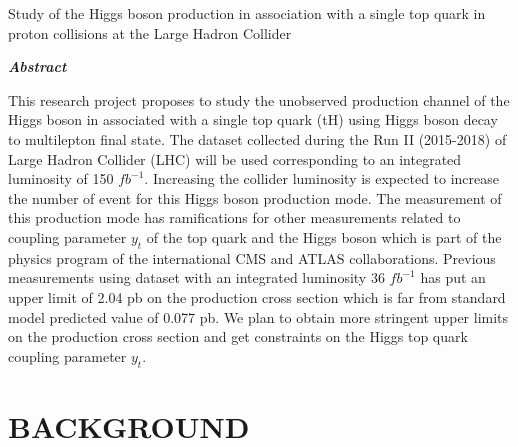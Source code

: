 \documentclass[final,3p]{CSP}
\def\ProjectTitle{Study of the Higgs boson production in association with a single top quark in proton collisions at the Large Hadron Collider}
\begin{document}
\begin{adjustwidth}{1cm}{1cm}

  \begin{center}
    {\Large \ProjectTitle \par}
    \vspace{1cm}
    {\itshape\textbf{Abstract}\par}
  \end{center}
  
  \vspace{1 cm}
 
  
\onehalfspacing This research project proposes to study the unobserved production channel of the Higgs boson in associated with a single top quark (tH) using Higgs boson decay to multilepton final state. The dataset collected during the Run II (2015-2018) of Large Hadron Collider (LHC) will be used corresponding to an integrated luminosity of 150 $fb^{-1}$. Increasing the collider luminosity is expected to increase the number of event for this Higgs boson production mode. The measurement of this production mode has ramifications for other measurements related to coupling parameter $y_t$ of the top quark and the Higgs boson which is part of the physics program of the international CMS and ATLAS collaborations. Previous measurements using dataset with an integrated luminosity 36 $fb^{-1}$ has put an upper limit of 2.04 pb on the production cross section which is far from standard model predicted value of 0.077 pb. We plan to obtain more stringent upper limits on the production cross section and get constraints on the Higgs top quark coupling parameter $y_t$. \par

\end{adjustwidth}

\hspace{2pt}
\vfill

\newpage
\section{BACKGROUND}
\end{document}
